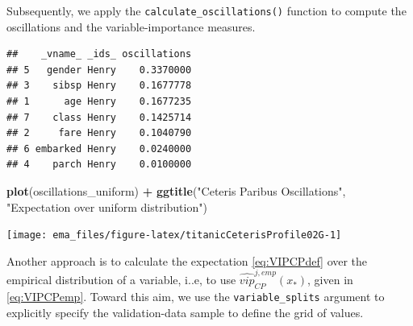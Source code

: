 \documentclass[]{krantz}
\newenvironment{Shaded}{\begin{snugshade}}{\end{snugshade}}
\newcommand{\DataTypeTok}[1]{\textcolor[rgb]{0.13,0.29,0.53}{#1}}
\newcommand{\KeywordTok}[1]{\textcolor[rgb]{0.13,0.29,0.53}{\textbf{#1}}}
\newcommand{\NormalTok}[1]{#1}
\newcommand{\OperatorTok}[1]{\textcolor[rgb]{0.81,0.36,0.00}{\textbf{#1}}}
\newcommand{\StringTok}[1]{\textcolor[rgb]{0.31,0.60,0.02}{#1}}
\begin{document}
Subsequently, we apply the \texttt{calculate\_oscillations()} function to compute the oscillations and the variable-importance measures.

\begin{Shaded}
\end{Shaded}

\begin{verbatim}
##    _vname_ _ids_ oscillations
## 5   gender Henry    0.3370000
## 3    sibsp Henry    0.1677778
## 1      age Henry    0.1677235
## 7    class Henry    0.1425714
## 2     fare Henry    0.1040790
## 6 embarked Henry    0.0240000
## 4    parch Henry    0.0100000
\end{verbatim}

\begin{Shaded}
\begin{Highlighting}[]
\KeywordTok{plot}\NormalTok{(oscillations_uniform) }\OperatorTok{+}\StringTok{ }
\StringTok{    }\KeywordTok{ggtitle}\NormalTok{(}\StringTok{"Ceteris Paribus Oscillations"}\NormalTok{, }
            \StringTok{"Expectation over uniform distribution"}\NormalTok{)}
\end{Highlighting}
\end{Shaded}

\begin{center}\texttt{[image: ema\_files/figure-latex/titanicCeterisProfile02G-1]} \end{center}

Another approach is to calculate the expectation \eqref{eq:VIPCPdef} over the empirical distribution of a variable, i..e, to use \(\widehat{vip}_{CP}^{j,emp}(x_*)\), given in \eqref{eq:VIPCPemp}. Toward this aim, we use the \texttt{variable\_splits} argument to explicitly specify the validation-data sample to define the grid of values.
\end{document}
